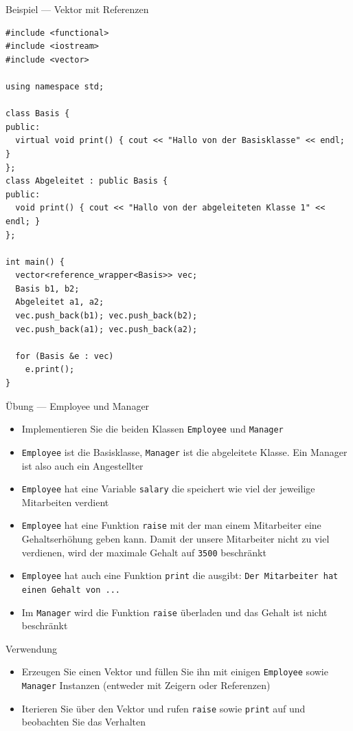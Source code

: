 \documentclass[presentation]{beamer}
\begin{document}
\begin{frame}[fragile,label={sec:org5850220}]{Beispiel --- Vektor mit Referenzen}
 \begin{verbatim}
#include <functional>
#include <iostream>
#include <vector>

using namespace std;

class Basis {
public:
  virtual void print() { cout << "Hallo von der Basisklasse" << endl; }
};
class Abgeleitet : public Basis {
public:
  void print() { cout << "Hallo von der abgeleiteten Klasse 1" << endl; }
};

int main() {
  vector<reference_wrapper<Basis>> vec;
  Basis b1, b2;
  Abgeleitet a1, a2;
  vec.push_back(b1); vec.push_back(b2);
  vec.push_back(a1); vec.push_back(a2);

  for (Basis &e : vec)
    e.print();
}
\end{verbatim}
\end{frame}
\begin{frame}[fragile,label={sec:orge46e233}]{Übung --- Employee und Manager}
 \footnotesize
\begin{itemize}
\item Implementieren Sie die beiden Klassen {\color{solarizedYellow}\texttt{Employee} }und {\color{solarizedYellow}\texttt{Manager}}
\item {\color{solarizedYellow}\texttt{Employee} }ist die Basisklasse, {\color{solarizedYellow}\texttt{Manager} }ist die abgeleitete
Klasse. Ein Manager ist also auch ein Angestellter
\item {\color{solarizedYellow}\texttt{Employee} }hat eine Variable {\color{solarizedYellow}\texttt{salary} }die speichert wie viel der
jeweilige Mitarbeiten verdient
\item {\color{solarizedYellow}\texttt{Employee} }hat eine Funktion {\color{solarizedYellow}\texttt{raise} }mit der man einem Mitarbeiter
eine Gehaltserhöhung geben kann. Damit der unsere Mitarbeiter nicht
zu viel verdienen, wird der maximale Gehalt auf {\color{solarizedYellow}\texttt{3500} }beschränkt
\item {\color{solarizedYellow}\texttt{Employee} }hat auch eine Funktion {\color{solarizedYellow}\texttt{print} }die ausgibt: {\color{solarizedYellow}\texttt{Der
  Mitarbeiter hat einen Gehalt von ...}}
\item Im {\color{solarizedYellow}\texttt{Manager} }wird die Funktion {\color{solarizedYellow}\texttt{raise} }überladen und das Gehalt ist
nicht beschränkt
\end{itemize}
\begin{block}{Verwendung}
\begin{itemize}
\item Erzeugen Sie einen Vektor und füllen Sie ihn mit einigen {\color{solarizedYellow}\texttt{Employee}}
sowie {\color{solarizedYellow}\texttt{Manager} }Instanzen (entweder mit Zeigern oder Referenzen)
\item Iterieren Sie über den Vektor und rufen {\color{solarizedYellow}\texttt{raise} }sowie {\color{solarizedYellow}\texttt{print} }auf
und beobachten Sie das Verhalten
\end{itemize}
\end{block}
\end{frame}
\end{document}

